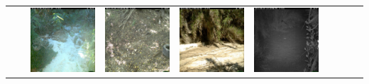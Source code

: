 \begin{table}[htbp]
\begin{tabularx}{\textwidth}{lcYYYYYYYY}
       & & \includegraphics[height=\imagequadsize, width=\imagequadsize]{Figures/Chapter2/TerraIncognita/TerraIncognita_env0location_100_0_idx823_class5.png} & \includegraphics[height=\imagequadsize, width=\imagequadsize]{Figures/Chapter2/TerraIncognita/TerraIncognita_env1location_38_35_idx2747_class5.png} & \includegraphics[height=\imagequadsize, width=\imagequadsize]{Figures/Chapter2/TerraIncognita/TerraIncognita_env2location_43_38_idx2211_class5.png} & \includegraphics[height=\imagequadsize, width=\imagequadsize]{Figures/Chapter2/TerraIncognita/TerraIncognita_env3location_46_37_idx2142_class5.png} & &  & & \\

\end{tabularx}
\end{table}

